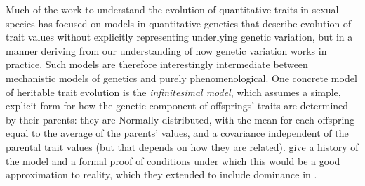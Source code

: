 \documentclass{article}
\newcommand{\1}{\mathbbm{1}}
\theoremstyle{remark}
\theoremstyle{definition}
\begin{document}
Much of the work to 
understand the evolution of quantitative traits in sexual species
has focused on models in quantitative genetics
that describe evolution of trait values without explicitly representing underlying genetic variation,
but in a manner deriving from our understanding of how genetic variation works in practice.
Such models are therefore
interestingly intermediate between mechanistic models of genetics and purely phenomenological.
One concrete model of heritable trait evolution is the \emph{infinitesimal model},
which assumes a simple, explicit form for how the genetic component of offsprings' traits are determined by their parents:
they are Normally distributed, with the mean for each offspring equal to the average of the parents' values,
and a covariance independent of the parental trait values (but that depends on how they are related).
\citet{barton2017infinitesimal} give a history of the model
and a formal proof of conditions under which this would be a good approximation to reality,
which they extended to include dominance in \citet{barton2022infinitesimal}.
\end{document}
